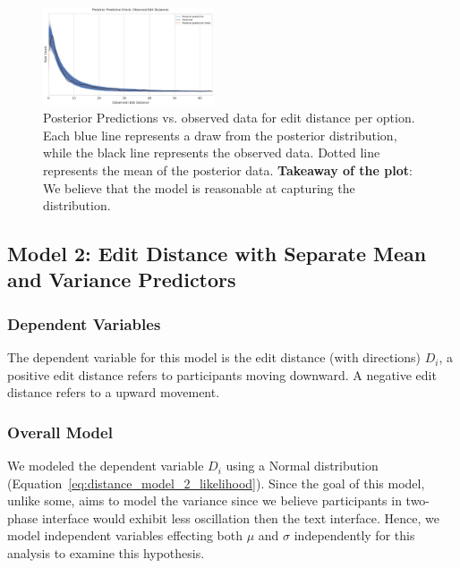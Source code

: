 \begin{figure}[h!]
    \centering
    \includegraphics[width=0.45\textwidth]{content/image/distance/ppc_distance_m1.pdf}
    \caption{Posterior Predictions vs. observed data for edit distance per option. Each blue line represents a draw from the posterior distribution, while the black line represents the observed data. Dotted line represents the mean of the posterior data. \textbf{Takeaway of the plot}: We believe that the model is reasonable at capturing the distribution.}
    \label{fig:ppc_distance_m1}
\end{figure}


\subsection{Model 2: Edit Distance with Separate Mean and Variance Predictors} \label{sec:apdx:model_distance_variance}

\subsubsection{Dependent Variables}
The dependent variable for this model is the edit distance (with directions) $D_i$, a positive edit distance refers to participants moving downward. A negative edit distance refers to a upward movement.

\subsubsection{Overall Model}
We modeled the dependent variable $D_i$ using a Normal distribution (Equation~\ref{eq:distance_model_2_likelihood}). Since the goal of this model, unlike some, aims to model the variance since we believe participants in two-phase interface would exhibit less oscillation then the text interface. Hence, we model independent variables effecting both $\mu$ and $\sigma$ independently for this analysis to examine this hypothesis.

